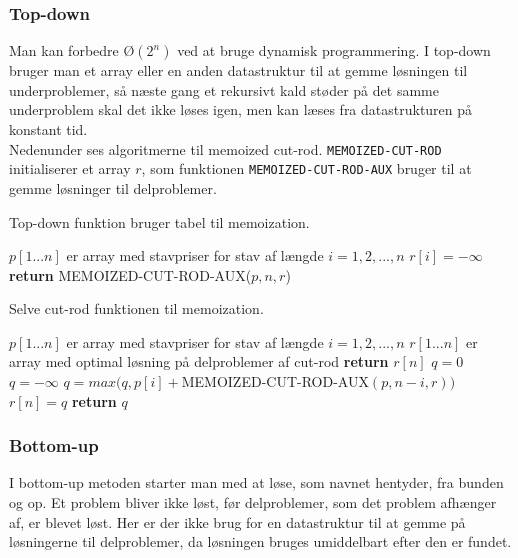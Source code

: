 \subsubsection{Top-down}
Man kan forbedre $Ø(2^n)$ ved at bruge dynamisk programmering. I top-down bruger man et array eller en anden datastruktur til at gemme løsningen til underproblemer, så næste gang et rekursivt kald støder på det samme underproblem skal det ikke løses igen, men kan læses fra datastrukturen på konstant tid.\\
Nedenunder ses algoritmerne til memoized cut-rod. \texttt{MEMOIZED-CUT-ROD} initialiserer et array $r$, som funktionen \texttt{MEMOIZED-CUT-ROD-AUX} bruger til at gemme løsninger til delproblemer.

\begin{algorithm}[H]
  \caption{Top-down funktion bruger tabel til memoization.}
  \begin{algorithmic}[1]
    \State $p[1...n]$ er array med stavpriser for stav af længde $i=1, 2, ..., n$
    \State $r[i] = -\infty$
    \EndFor
    \State \textbf{return} MEMOIZED-CUT-ROD-AUX($p, n, r$)
    \EndFunction
  \end{algorithmic}
\end{algorithm}
\begin{algorithm}[H]
  \caption{Selve cut-rod funktionen til memoization.}
  \begin{algorithmic}[1]
    \State $p[1...n]$ er array med stavpriser for stav af længde $i=1, 2, ..., n$
    \State $r[1...n]$ er array med optimal løsning på delproblemer af cut-rod
    \State \textbf{return} $r[n]$
    \EndIf
    \State $q=0$
    \Else
    \State $q = -\infty$
    \State $q = max(q, p[i] + $MEMOIZED-CUT-ROD-AUX$(p, n-i, r))$
    \EndFor
    \EndIf
    \State $r[n] = q$
    \State \textbf{return} $q$
    \EndFunction
  \end{algorithmic}
\end{algorithm}

\subsubsection{Bottom-up}
I bottom-up metoden starter man med at løse, som navnet hentyder, fra bunden og op. Et problem bliver ikke løst, før delproblemer, som det problem afhænger af, er blevet løst. Her er der ikke brug for en datastruktur til at gemme på løsningerne til delproblemer, da løsningen bruges umiddelbart efter den er fundet.\\

